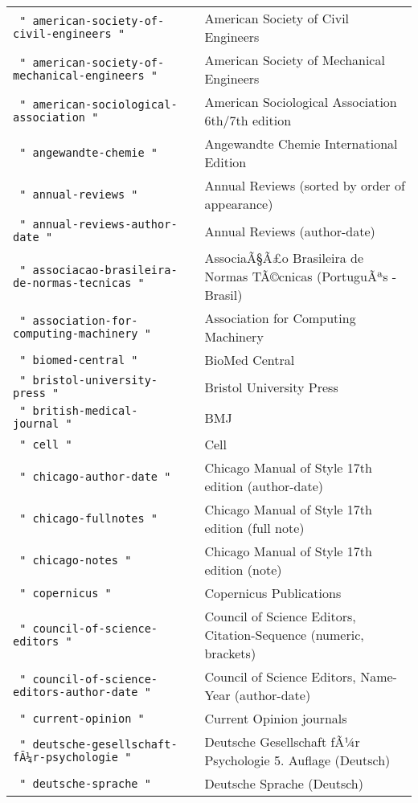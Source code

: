 \begin{longtable}[]{@{}ll@{}}
\texttt{\ "\ american-society-of-civil-engineers\ "\ } & American
Society of Civil Engineers \\
\texttt{\ "\ american-society-of-mechanical-engineers\ "\ } & American
Society of Mechanical Engineers \\
\texttt{\ "\ american-sociological-association\ "\ } & American
Sociological Association 6th/7th edition \\
\texttt{\ "\ angewandte-chemie\ "\ } & Angewandte Chemie International
Edition \\
\texttt{\ "\ annual-reviews\ "\ } & Annual Reviews (sorted by order of
appearance) \\
\texttt{\ "\ annual-reviews-author-date\ "\ } & Annual Reviews
(author-date) \\
\texttt{\ "\ associacao-brasileira-de-normas-tecnicas\ "\ } &
AssociaÃ§Ã£o Brasileira de Normas TÃ©cnicas (PortuguÃªs - Brasil) \\
\texttt{\ "\ association-for-computing-machinery\ "\ } & Association for
Computing Machinery \\
\texttt{\ "\ biomed-central\ "\ } & BioMed Central \\
\texttt{\ "\ bristol-university-press\ "\ } & Bristol University
Press \\
\texttt{\ "\ british-medical-journal\ "\ } & BMJ \\
\texttt{\ "\ cell\ "\ } & Cell \\
\texttt{\ "\ chicago-author-date\ "\ } & Chicago Manual of Style 17th
edition (author-date) \\
\texttt{\ "\ chicago-fullnotes\ "\ } & Chicago Manual of Style 17th
edition (full note) \\
\texttt{\ "\ chicago-notes\ "\ } & Chicago Manual of Style 17th edition
(note) \\
\texttt{\ "\ copernicus\ "\ } & Copernicus Publications \\
\texttt{\ "\ council-of-science-editors\ "\ } & Council of Science
Editors, Citation-Sequence (numeric, brackets) \\
\texttt{\ "\ council-of-science-editors-author-date\ "\ } & Council of
Science Editors, Name-Year (author-date) \\
\texttt{\ "\ current-opinion\ "\ } & Current Opinion journals \\
\texttt{\ "\ deutsche-gesellschaft-fÃ¼r-psychologie\ "\ } & Deutsche
Gesellschaft fÃ¼r Psychologie 5. Auflage (Deutsch) \\
\texttt{\ "\ deutsche-sprache\ "\ } & Deutsche Sprache (Deutsch) \\

\end{longtable}
